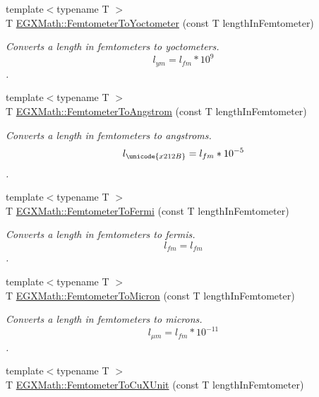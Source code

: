 \begin{DoxyCompactItemize}
{\footnotesize template$<$typename T $>$ }\\T \mbox{\hyperlink{group___e_g_x_math-_conversions-_length_conversions-_s_i-_femtometer-_s_i_ga6406395140da34327a85098a7dd9e4f0}{E\+G\+X\+Math\+::\+Femtometer\+To\+Yoctometer}} (const T length\+In\+Femtometer)
\begin{DoxyCompactList}\small\item\em Converts a length in femtometers to yoctometers. \[ l_{ym}=l_{fm} * 10^{9} \]. \end{DoxyCompactList}\item 
{\footnotesize template$<$typename T $>$ }\\T \mbox{\hyperlink{group___e_g_x_math-_conversions-_length_conversions-_s_i-_femtometer-_non-_s_i_ga72862654ebe3812db0fbf8d11d7059ff}{E\+G\+X\+Math\+::\+Femtometer\+To\+Angstrom}} (const T length\+In\+Femtometer)
\begin{DoxyCompactList}\small\item\em Converts a length in femtometers to angstroms. \[ l_{\unicode{x212B}}=l_{fm} * 10^{-5} \]. \end{DoxyCompactList}\item 
{\footnotesize template$<$typename T $>$ }\\T \mbox{\hyperlink{group___e_g_x_math-_conversions-_length_conversions-_s_i-_femtometer-_non-_s_i_gaa2e838ef76ce47a3375291d76990b865}{E\+G\+X\+Math\+::\+Femtometer\+To\+Fermi}} (const T length\+In\+Femtometer)
\begin{DoxyCompactList}\small\item\em Converts a length in femtometers to fermis. \[ l_{fm}=l_{fm} \]. \end{DoxyCompactList}\item 
{\footnotesize template$<$typename T $>$ }\\T \mbox{\hyperlink{group___e_g_x_math-_conversions-_length_conversions-_s_i-_femtometer-_non-_s_i_gac1a358bdb9bf33dec3cb847cafe1bc71}{E\+G\+X\+Math\+::\+Femtometer\+To\+Micron}} (const T length\+In\+Femtometer)
\begin{DoxyCompactList}\small\item\em Converts a length in femtometers to microns. \[ l_{\mu m}=l_{fm} * 10^{-11} \]. \end{DoxyCompactList}\item 
{\footnotesize template$<$typename T $>$ }\\T \mbox{\hyperlink{group___e_g_x_math-_conversions-_length_conversions-_s_i-_femtometer-_non-_s_i_ga59bde341fe80506851e39cd2ceb3747b}{E\+G\+X\+Math\+::\+Femtometer\+To\+Cu\+X\+Unit}} (const T length\+In\+Femtometer)

\end{DoxyCompactItemize}
